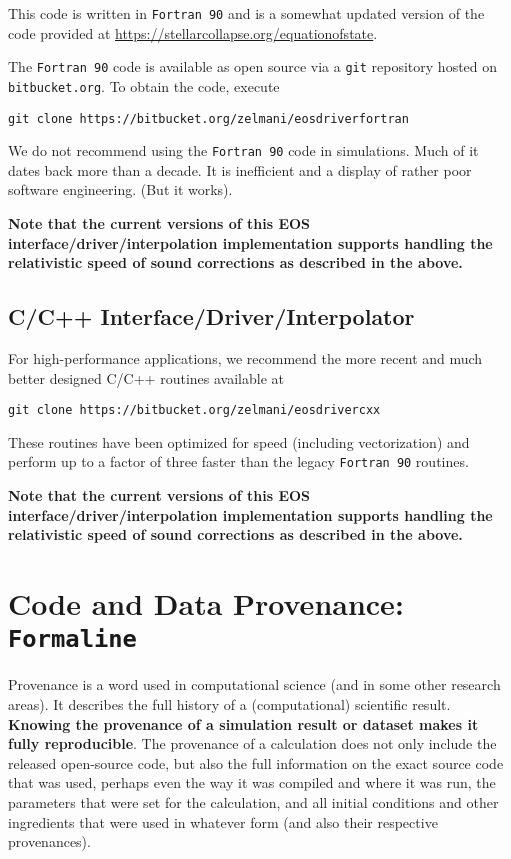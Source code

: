 \documentclass[letterpaper,11pt]{refart}
\begin{document}
This code is written in \texttt{Fortran 90} and is a somewhat updated
version of the code provided at
\url{https://stellarcollapse.org/equationofstate}.

The \texttt{Fortran 90} code is available as open source via a
\texttt{git} repository hosted on \texttt{bitbucket.org}. To obtain
the code, execute

\noindent \texttt{git clone https://bitbucket.org/zelmani/eosdriverfortran}

We do not recommend using the \texttt{Fortran 90} code in simulations.
Much of it dates back more than a decade. It is inefficient and a
display of rather poor software engineering. (But it works).

\textbf{Note that the current versions of this EOS
  interface/driver/interpolation implementation supports handling the
  relativistic speed of sound corrections as described in the above.}


\subsection{C/C++ Interface/Driver/Interpolator}

For high-performance applications, we recommend the more recent and much
better designed C/C++ routines available at


\noindent \texttt{git clone https://bitbucket.org/zelmani/eosdrivercxx}

These routines have been optimized for speed (including vectorization)
and perform up to a factor of three faster than the legacy
\texttt{Fortran 90} routines.

\textbf{Note that the current versions of this EOS
  interface/driver/interpolation implementation supports handling the
  relativistic speed of sound corrections as described in the above.}

\section{Code and Data Provenance: \texttt{Formaline}}
\label{sec:formaline}

Provenance is a word used in computational science (and in some other
research areas). It describes the full history of a (computational)
scientific result. \textbf{Knowing the provenance of a simulation
  result or dataset makes it fully reproducible}. The provenance of a
calculation does not only include the released open-source code, but
also the full information on the exact source code that was used,
perhaps even the way it was compiled and where it was run, the
parameters that were set for the calculation, and all initial
conditions and other ingredients that were used in whatever form (and
also their respective provenances).
\end{document}
